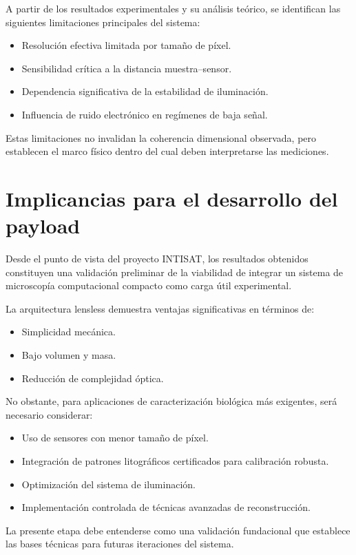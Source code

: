 A partir de los resultados experimentales y su análisis teórico, se identifican las siguientes limitaciones principales del sistema:

\begin{itemize}
    \item Resolución efectiva limitada por tamaño de píxel.
    \item Sensibilidad crítica a la distancia muestra–sensor.
    \item Dependencia significativa de la estabilidad de iluminación.
    \item Influencia de ruido electrónico en regímenes de baja señal.
\end{itemize}

Estas limitaciones no invalidan la coherencia dimensional observada, pero establecen el marco físico dentro del cual deben interpretarse las mediciones.
\section{Implicancias para el desarrollo del payload}

Desde el punto de vista del proyecto INTISAT, los resultados obtenidos constituyen una validación preliminar de la viabilidad de integrar un sistema de microscopía computacional compacto como carga útil experimental.

La arquitectura lensless demuestra ventajas significativas en términos de:

\begin{itemize}
    \item Simplicidad mecánica.
    \item Bajo volumen y masa.
    \item Reducción de complejidad óptica.
\end{itemize}

No obstante, para aplicaciones de caracterización biológica más exigentes, será necesario considerar:

\begin{itemize}
    \item Uso de sensores con menor tamaño de píxel.
    \item Integración de patrones litográficos certificados para calibración robusta.
    \item Optimización del sistema de iluminación.
    \item Implementación controlada de técnicas avanzadas de reconstrucción.
\end{itemize}

La presente etapa debe entenderse como una validación fundacional que establece las bases técnicas para futuras iteraciones del sistema.
